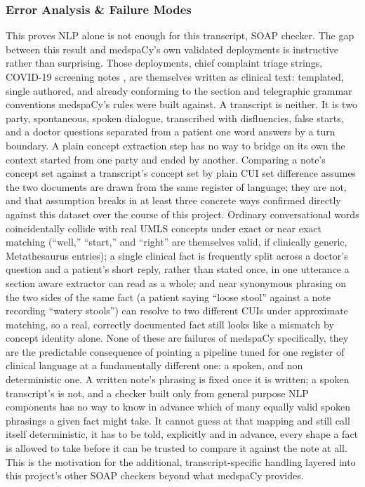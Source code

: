 \documentclass[11pt,a4paper]{article}
\begin{document}
\subsubsection{Error Analysis \& Failure Modes}
\label{sec:Why one NLP alone is not enough}
This proves NLP alone is not enough for this transcript, SOAP checker. The gap between this result and medspaCy's own validated deployments is instructive rather than surprising. Those deployments, chief complaint triage strings, COVID-19 screening notes \cite{eyre2021launching} , are themselves written as clinical text: templated, single authored, and already conforming to the section and telegraphic grammar conventions medspaCy's rules were built against. 
A transcript is neither. It is two party, spontaneous, spoken dialogue, transcribed with disfluencies, false starts, and a doctor questions separated from a patient one word answers by a turn boundary. A plain concept extraction step has no way to bridge on its own the context started from one party and ended by another. Comparing a note's concept set against a transcript's concept set by plain CUI set difference assumes the two documents are drawn from the same register of language; they are not, and that assumption breaks in at least three concrete ways confirmed directly against this dataset over the course of this project.
Ordinary conversational words coincidentally collide with real UMLS concepts under exact or near exact matching (“well,” “start,” and “right” are themselves valid, if clinically generic, Metathesaurus entries); a single clinical fact is frequently split across a doctor's question and a patient's short reply, rather than stated once, in one utterance a section aware extractor can read as a whole; and near synonymous phrasing on the two sides of the same fact (a patient saying “loose stool” against a note recording “watery stools”) can resolve to two different CUIs under approximate matching, so a real, correctly documented fact still looks like a mismatch by concept identity alone.
None of these are failures of medspaCy specifically, they are the predictable consequence of pointing a pipeline tuned for one register of clinical language at a fundamentally different one: a spoken, and non deterministic one. A written note's phrasing is fixed once it is written; a spoken transcript's is not, and a checker built only from general purpose NLP components has no  way to know in advance which of many equally valid spoken phrasings a given fact might take. It cannot  guess at that mapping and still call itself deterministic, it has to be told, explicitly and in advance, every shape a fact is allowed to take before it can be trusted to compare it against the note at all. This is the motivation for the additional, transcript-specific handling layered into this project's other SOAP checkers beyond what medspaCy provides.
\end{document}
